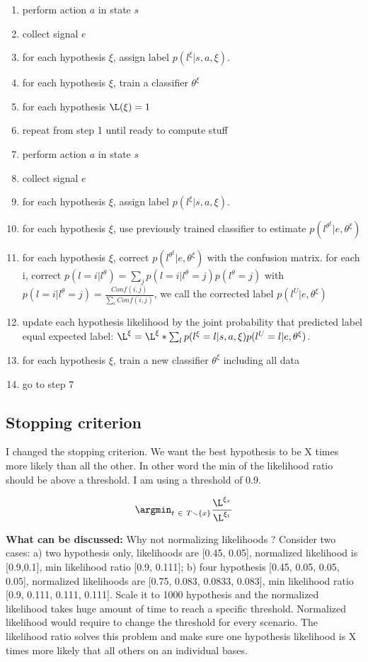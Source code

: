 \begin{enumerate}
\item perform action $a$ in state $s$
\item collect signal $e$
\item for each hypothesis $\xi$, assign label $p(l^\xi | s, a, \xi)$.
\item for each hypothesis $\xi$, train a classifier $\theta^\xi$
\item for each  hypothesis $\L(\xi) = 1$
\item repeat from step 1 until ready to compute stuff
\item perform action $a$ in state $s$
\item collect signal $e$
\item for each hypothesis $\xi$, assign label $p(l^\xi | s, a, \xi)$.
\item for each hypothesis $\xi$, use previously trained classifier to estimate $p(l^{\theta^\xi} | e, \theta^\xi)$
\item for each hypothesis $\xi$, correct $p(l^{\theta^\xi} | e, \theta^\xi)$ with the confusion matrix. for each i, correct $p(l = i | l^\theta) = \sum_{j} p(l = i | l^\theta = j) p(l^\theta = j)$ with  $p(l = i | l^\theta = j) = \frac{Conf(i,j)}{\sum_i Conf(i,j)}$, we call the corrected label $p(l^U | e, \theta^\xi)$
\item update each hypothesis likelihood by the joint probability that predicted label equal expected label: $\L^\xi = \L^\xi * \sum_l p(l^\xi = l | s,a,\xi) p(l^U = l| e, \theta^\xi)$.
\item for each hypothesis $\xi$, train a new classifier $\theta^\xi$ including all data
\item go to step 7
\end{enumerate}


\subsection{Stopping criterion}

I changed the stopping criterion. We want the best hypothesis to be X times more likely than all the other. In other word the min of the likelihood ratio should be above a threshold. I am using a threshold of 0.9.

\begin{eqnarray}
\argmin_{t~\in~T \smallsetminus \{x\}} \frac{\L^{\xi_x}}{\L^{\xi_t}}
\end{eqnarray}

\textbf{What can be discussed:} Why not normalizing likelihoods ? Consider two cases: a) two hypothesis only, likelihoods are [0.45, 0.05], normalized likelihood is [0.9,0.1], min likelihood ratio [0.9, 0.111]; b) four hypothesis [0.45, 0.05, 0.05, 0.05], normalized likelihoods are [0.75, 0.083, 0.0833, 0.083], min likelihood ratio [0.9, 0.111, 0.111, 0.111]. Scale it to 1000 hypothesis and the normalized likelihood takes huge amount of time to reach a specific threshold. Normalized likelihood would require to change the threshold for every scenario. The likelihood ratio solves this problem and make sure one hypothesis likelihood is X times more likely that all others on an individual bases.

